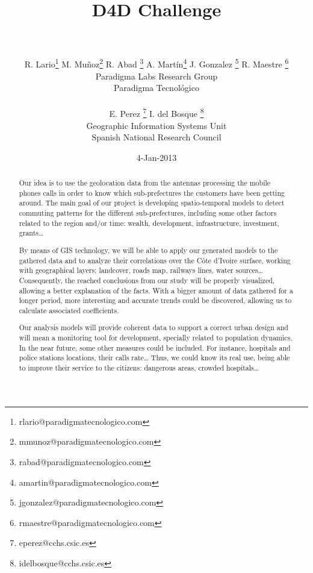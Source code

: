 \documentclass[a4paper,11pt]{article}
\begin{document}
\title{{\huge D4D Challenge} \\  \\ }

\author{{
				R. Lario\footnote{rlario@paradigmatecnologico.com} 
				M. Muñoz\footnote{mmunoz@paradigmatecnologico.com} 
				R. Abad \footnote{rabad@paradigmatecnologico.com} 
				A. Martín\footnote{amartin@paradigmatecnologico.com} 
				J. Gonzalez \footnote{jgonzalez@paradigmatecnologico.com} 
				R. Maestre \footnote{rmaestre@paradigmatecnologico.com} 
				\\\small Paradigma Labs Research Group \\\small Paradigma Tecnológico\\ \\
				E. Perez \footnote{eperez@cchs.csic.es} 
				I. del Bosque \footnote{idelbosque@cchs.csic.es} 
				\\\small Geographic Information Systems Unit \\\small Spanish National Research Council
				}}

\date{4-Jan-2013}
\maketitle

\begin{abstract} 
Our idea is to use the geolocation data from the antennas processing the mobile phones calls in order to know which sub-prefectures the customers have been getting around. The main goal of our project is developing spatio-temporal models to detect commuting patterns for the different sub-prefectures, including some other factors related to the region and/or time: wealth, development, infrastructure, investment, grants…

By means of GIS technology, we will be able to apply our generated models to the gathered data and to analyze their correlations over the Côte d’Ivoire surface, working with geographical layers: landcover, roads map, railways lines, water sources… Consequently, the reached conclusions from our study will be properly visualized, allowing a better explanation of the facts. With a bigger amount of data gathered for a longer period, more interesting and accurate trends could be discovered, allowing us to calculate associated coefficients.

Our analysis models will provide coherent data to support a correct urban design and will mean a monitoring tool for development, specially related to population dynamics.
In the near future, some other measures could be included. For instance, hospitals and police stations locations, their calls rate… Thus, we could know its real use, being able to improve their service to the citizens: dangerous areas, crowded hospitals…
\end{abstract}

\newpage
\setcounter{secnumdepth}{0}















\newpage


\end{document}
